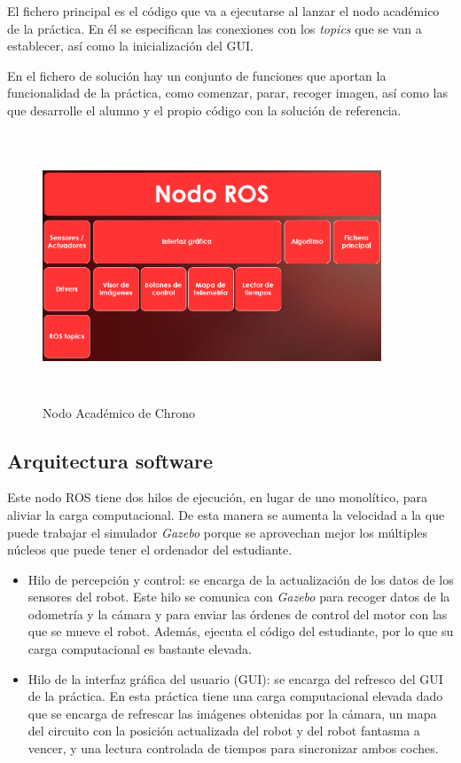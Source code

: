 El fichero principal es el código que va a ejecutarse al lanzar el nodo académico de la práctica. En él se especifican las conexiones con los \textit{topics} que se van a establecer, así como la inicialización del GUI.

En el fichero de solución hay un conjunto de funciones que aportan la funcionalidad de la práctica, como comenzar, parar, recoger imagen, así como las que desarrolle el alumno y el propio código con la solución de referencia.

\begin{figure}[H]
  \begin{center}
    \includegraphics[width=0.9\textwidth, height=8cm]{figures/na_ch.png}
		\caption{Nodo Académico de Chrono}
		\label{fig.na_ch}
		\end{center}
\end{figure}

\subsection{Arquitectura software}
Este nodo ROS tiene dos hilos de ejecución, en lugar de uno monolítico, para aliviar la carga computacional. De esta manera se aumenta la velocidad a la que puede trabajar el simulador \textit{Gazebo} porque se aprovechan mejor los múltiples núcleos que puede tener el ordenador del estudiante.

\begin{itemize}
	\item Hilo de percepción y control: se encarga de la actualización de los datos de los sensores del robot. Este hilo se comunica con \textit{Gazebo} para recoger datos de la odometría y la cámara y para enviar las órdenes de control del motor con las que se mueve el robot. Además, ejecuta el código del estudiante, por lo que su carga computacional es bastante elevada.
	\item Hilo de la interfaz gráfica del usuario (GUI): se encarga del refresco del GUI de la práctica. En esta práctica tiene una carga computacional elevada dado que se encarga de refrescar las imágenes obtenidas por la cámara, un mapa del circuito con la posición actualizada del robot y del robot fantasma a vencer, y una lectura controlada de tiempos para sincronizar ambos coches.
\end{itemize}

